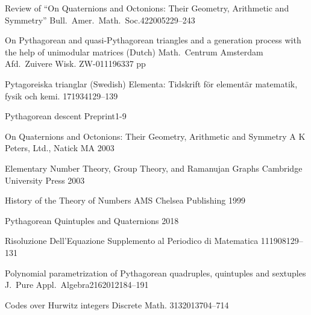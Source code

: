 \documentclass[12pt,table]{article}
\theoremstyle{definition}
\theoremstyle{remark}
\numberwithin{equation}{section}
\begin{document}
\begin{thebibliography}{1}



        {Review of ``On Quaternions and Octonions: 
         Their Geometry, Arithmetic and Symmetry''}
        {Bull.\ Amer.\ Math.\ Soc.}{42}{2005}{229--243}
        


      {On Pythagorean and quasi-Pythagorean triangles and a
      generation process with the help of unimodular matrices (Dutch)}
      {Math.\ Centrum Amsterdam Afd.\ Zuivere Wisk.}
      {ZW-011}{1963}{37 pp}



        {Pytagoreiska trianglar (Swedish)} 
        {Elementa: Tidskrift f\"or element\"ar
        matematik, fysik och kemi.}
        {17}{1934}{129--139}

        {Pythagorean descent}
        {}
        {}{Preprint}{1-9}



     {On Quaternions and Octonions: 
      Their Geometry, Arithmetic and Symmetry}
     {A K Peters, Ltd., Natick MA}
     {2003}


         {Elementary Number Theory,
           Group Theory,
           and Ramanujan Graphs}
         {Cambridge University Press}
         {2003}

         {History of the Theory of Numbers}
         {AMS Chelsea Publishing}
         {1999}

        {Pythagorean Quintuples and Quaternions}
        {2018}




        {Risoluzione Dell'Equazione}
        {Supplemento al Periodico di Matematica}
        {11}{1908}{129--131}



       {Polynomial parametrization of Pythagorean quadruples,
        quintuples and sextuples}
       {J.\ Pure Appl.\ Algebra}{216}{2012}{184--191}


        {Codes over Hurwitz integers}
        {Discrete Math.}
        {313}{2013}{704--714}




\end{thebibliography}
\end{document}
